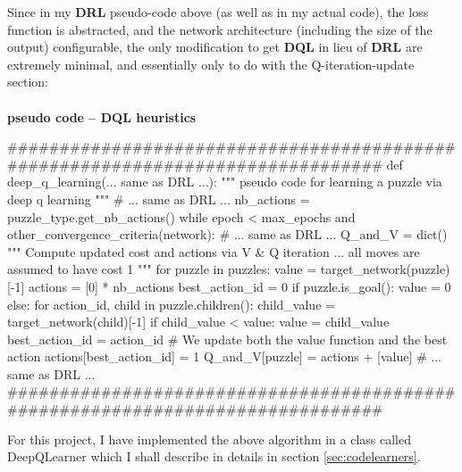Since in my \textbf{DRL} pseudo-code above (as well as in my actual code), the loss function is abstracted, and the network architecture (including the size of the output) configurable, the only modification to get \textbf{DQL} in lieu of \textbf{DRL} are extremely minimal, and essentially only to do with the Q-iteration-update section:


\teal
\paragraph{}{\textbf{pseudo code -- \textbf{DQL} heuristics}}
\begin{pseudocode}
###############################################################################
def deep_q_learning(... same as DRL ...):
    """ pseudo code for learning a puzzle via deep q learning """
    # ... same as DRL ...
    nb_actions = puzzle_type.get_nb_actions()
    while epoch < max_epochs and other_convergence_criteria(network):
        # ... same as DRL ...
        Q_and_V = dict()
        """ Compute updated cost and actions via V & Q iteration ... 
             all moves are assumed to have cost 1 """
        for puzzle in puzzles:
            value = target_network(puzzle)[-1]
            actions = [0] * nb_actions
            best_action_id = 0
            if puzzle.is_goal():
                value = 0
            else:
                for action_id, child in puzzle.children():
                    child_value = target_network(child)[-1]
                    if child_value < value:
                        value = child_value
                        best_action_id = action_id
            # We update both the value function and the best action
            actions[best_action_id] = 1
            Q_and_V[puzzle] = actions + [value]
        # ... same as DRL ...
###############################################################################
\end{pseudocode}
\black


For this project, I have implemented the above algorithm in a class called DeepQLearner which I shall describe in details in section \ref{sec:codelearners}.



